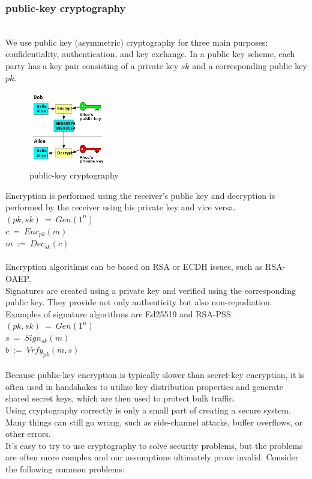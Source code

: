 \subsubsection{public-key cryptography}\cite{b38}
\\
We use public key (asymmetric) cryptography for three main purposes: confidentiality, 
authentication, and key exchange. In a public key scheme, each party has a key pair 
consisting of a private key $sk$ and a corresponding public key $pk$.
\begin{figure}[H] %
    \centering %
    \includegraphics[width=0.3\textwidth]{figures/public_key.png} %
    \caption{public-key cryptography} %
    \label{Fig.2: public-key cryptography} %
\end{figure}
Encryption is performed using the receiver's public key and decryption is performed 
by the receiver using his private key and vice versa.
\\
$(pk, sk) \ = \ Gen(1^n)$
\\
$c \ = \ Enc_{pk}(m)$
\\
$m \ := \ Dec_{sk}(c)$
\\
\\
Encryption algorithms can be based on RSA or ECDH issues, such as RSA-OAEP.
\\
Signatures are created using a private key and verified using the corresponding public key. 
They provide not only authenticity but also non-repudiation. Examples of signature algorithms 
are Ed25519 and RSA-PSS.
\\
$(pk, sk) \ = \ Gen(1^n)$
\\
$s \ = \ Sign_{sk}(m)$
\\
$b \ := \ Vrfy_{pk}(m, s)$
\\
\\
Because public-key encryption is typically slower than secret-key encryption, it is often 
used in handshakes to utilize key distribution properties and generate shared secret keys, 
which are then used to protect bulk traffic.
\\
Using cryptography correctly is only a small part of creating a secure system. Many things 
can still go wrong, such as side-channel attacks, buffer overflows, or other errors.
\\
It's easy to try to use cryptography to solve security problems, but the problems are often 
more complex and our assumptions ultimately prove invalid. Consider the following common problems:

